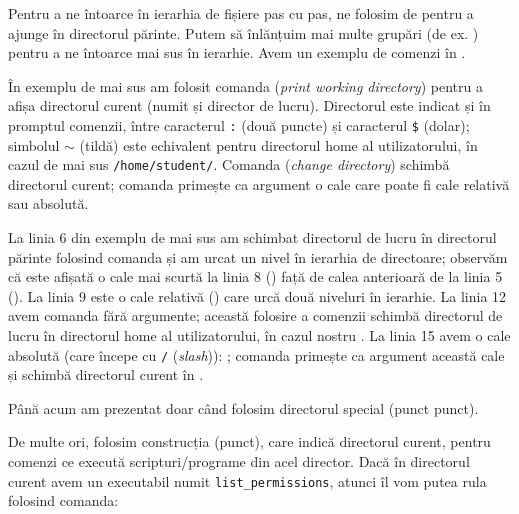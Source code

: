 Pentru a ne întoarce în ierarhia de fișiere pas cu pas, ne folosim de  pentru a ajunge în directorul părinte. Putem să înlănțuim mai multe grupări  (de ex. ) pentru a ne întoarce mai sus în ierarhie. Avem un exemplu de comenzi în .


În exemplu de mai sus am folosit comanda  (\textit{print working directory}) pentru a afișa directorul curent (numit și director de lucru). Directorul este indicat și în promptul comenzii, între caracterul \texttt{:} (două puncte) și caracterul \texttt{\$} (dolar); simbolul \texttt{$\sim$} (tildă) este echivalent pentru directorul home al utilizatorului, în cazul de mai sus \texttt{/home/student/}. Comanda  (\textit{change directory}) schimbă directorul curent; comanda primește ca argument o cale care poate fi cale relativă sau absolută.

La linia 6 din exemplu de mai sus am schimbat directorul de lucru în directorul părinte folosind comanda  și am urcat un nivel în ierarhia de directoare; observăm că este afișată o cale mai scurtă la linia 8 () față de calea anterioară de la linia 5 (). La linia 9 este o cale relativă () care urcă două niveluri în ierarhie. La linia 12 avem comanda  fără argumente; această folosire a comenzii schimbă directorul de lucru în directorul home al utilizatorului, în cazul nostru . La linia 15 avem o cale absolută (care începe cu \texttt{/} (\textit{slash})): ; comanda  primește ca argument această cale și schimbă directorul curent în .

Până acum am prezentat doar când folosim directorul special  (punct punct).

De multe ori, folosim construcția  (punct), care indică directorul curent, pentru comenzi ce execută scripturi/programe din acel director. Dacă în directorul curent avem un executabil numit \texttt{list\_permissions}, atunci îl vom putea rula folosind comanda:

